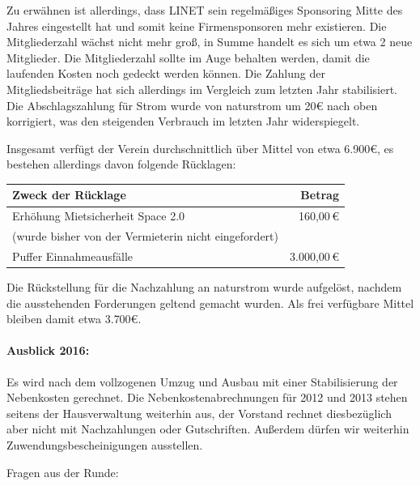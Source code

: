 \documentclass[a4paper,12pt]{scrartcl}
\begin{document}
Zu erwähnen ist allerdings, dass LINET sein regelmäßiges Sponsoring Mitte des
Jahres eingestellt hat und somit keine Firmensponsoren mehr existieren. Die
Mitgliederzahl wächst nicht mehr groß, in Summe handelt es sich um etwa 2 neue
Mitglieder. Die Mitgliederzahl sollte im Auge behalten werden, damit die
laufenden Kosten noch gedeckt werden können. Die Zahlung der Mitgliedsbeiträge
hat sich allerdings im Vergleich zum letzten Jahr stabilisiert. Die
Abschlagszahlung für Strom wurde von naturstrom um 20€ nach oben korrigiert, was
den steigenden Verbrauch im letzten Jahr widerspiegelt.

Insgesamt verfügt der Verein durchschnittlich über Mittel von etwa 6{.}900€, es
bestehen allerdings davon folgende Rücklagen:

\begin{center}
\begin{tabular}{|l|r|}
  \hline
  \textbf{Zweck der Rücklage} & \textbf{Betrag} \\
  \hline
  Erhöhung Mietsicherheit Space 2.0 &     160{,}00\,€ \\
  \qquad (wurde bisher von der Vermieterin nicht eingefordert) & \\
  Puffer Einnahmeausfälle           & 3{.}000{,}00\,€ \\
  \hline
\end{tabular}
\end{center}

Die Rückstellung für die Nachzahlung an naturstrom wurde aufgelöst, nachdem die
ausstehenden Forderungen geltend gemacht wurden. Als frei verfügbare Mittel
bleiben damit etwa 3{.}700€.

\paragraph{Ausblick 2016:} Es wird nach dem vollzogenen Umzug und Ausbau mit
einer Stabilisierung der Nebenkosten gerechnet.  Die  Nebenkostenabrechnungen
für 2012 und 2013 stehen seitens der Hausverwaltung weiterhin aus, der Vorstand
rechnet diesbezüglich aber nicht mit Nachzahlungen oder Gutschriften. Außerdem
dürfen wir weiterhin Zuwendungsbescheinigungen ausstellen.

Fragen aus der Runde:

\end{document}
